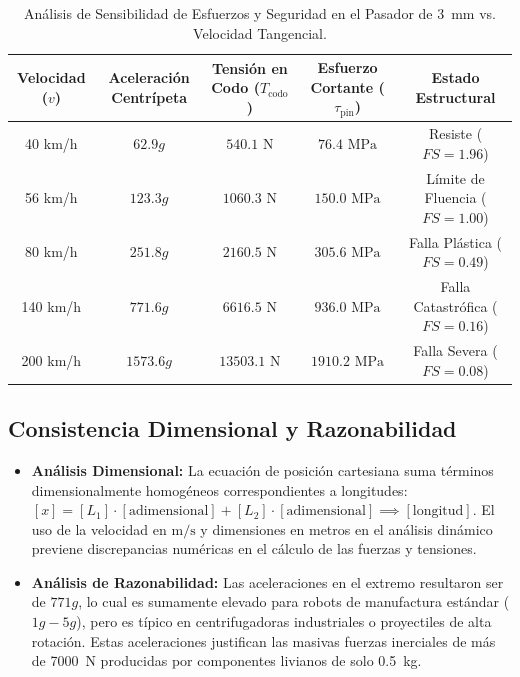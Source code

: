 \documentclass[11pt,a4paper]{article}
\begin{document}
\begin{table}[H]
    \centering
    \caption{Análisis de Sensibilidad de Esfuerzos y Seguridad en el Pasador de 3~mm vs. Velocidad Tangencial.}
    \label{tab:sensibilidad}
    \begin{tabular}{ccccc}
        \toprule
        \textbf{Velocidad ($v$)} & \textbf{Aceleración Centrípeta} & \textbf{Tensión en Codo ($T_{\text{codo}}$)} & \textbf{Esfuerzo Cortante ($\tau_{\text{pin}}$)} & \textbf{Estado Estructural} \\
        \midrule
        40 km/h  & $62.9g$   & $540.1\text{ N}$   & $76.4\text{ MPa}$   & Resiste ($FS = 1.96$) \\
        56 km/h  & $123.3g$  & $1060.3\text{ N}$  & $150.0\text{ MPa}$  & Límite de Fluencia ($FS = 1.00$) \\
        80 km/h  & $251.8g$  & $2160.5\text{ N}$  & $305.6\text{ MPa}$  & Falla Plástica ($FS = 0.49$) \\
        140 km/h & $771.6g$  & $6616.5\text{ N}$  & $936.0\text{ MPa}$  & Falla Catastrófica ($FS = 0.16$) \\
        200 km/h & $1573.6g$ & $13503.1\text{ N}$ & $1910.2\text{ MPa}$ & Falla Severa ($FS = 0.08$) \\
        \bottomrule
    \end{tabular}
\end{table}

\subsection{Consistencia Dimensional y Razonabilidad}
\begin{itemize}
    \item \textbf{Análisis Dimensional:} La ecuación de posición cartesiana suma términos dimensionalmente homogéneos correspondientes a longitudes: $[x] = [L_1] \cdot [\text{adimensional}] + [L_2] \cdot [\text{adimensional}] \implies [\text{longitud}]$. El uso de la velocidad en $\text{m/s}$ y dimensiones en metros en el análisis dinámico previene discrepancias numéricas en el cálculo de las fuerzas y tensiones.
    \item \textbf{Análisis de Razonabilidad:} Las aceleraciones en el extremo resultaron ser de $771g$, lo cual es sumamente elevado para robots de manufactura estándar ($1g - 5g$), pero es típico en centrifugadoras industriales o proyectiles de alta rotación. Estas aceleraciones justifican las masivas fuerzas inerciales de más de 7000~N producidas por componentes livianos de solo 0.5~kg.
\end{itemize}
\end{document}
